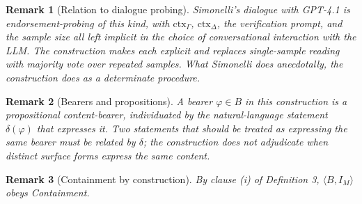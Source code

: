 \documentclass[11pt]{article}
\newtheorem{remark}{Remark}
\begin{document}
\begin{remark}[Relation to dialogue probing]
Simonelli's dialogue with GPT-4.1 \cite{simonelli2026} is endorsement-probing of this kind, with $\mathrm{ctx}_\Gamma$, $\mathrm{ctx}_\Delta$, the verification prompt, and the sample size all left implicit in the choice of conversational interaction with the LLM. The construction makes each explicit and replaces single-sample reading with majority vote over repeated samples. What Simonelli does anecdotally, the construction does as a determinate procedure.
\end{remark}

\begin{remark}[Bearers and propositions]
A bearer $\varphi \in B$ in this construction is a propositional content-bearer, individuated by the natural-language statement $\delta(\varphi)$ that expresses it. Two statements that should be treated as expressing the same bearer must be related by $\delta$; the construction does not adjudicate when distinct surface forms express the same content.
\end{remark}

\begin{remark}[Containment by construction]
By clause (i) of Definition 3, $\langle B, I_M \rangle$ obeys Containment.
\end{remark}
\end{document}
